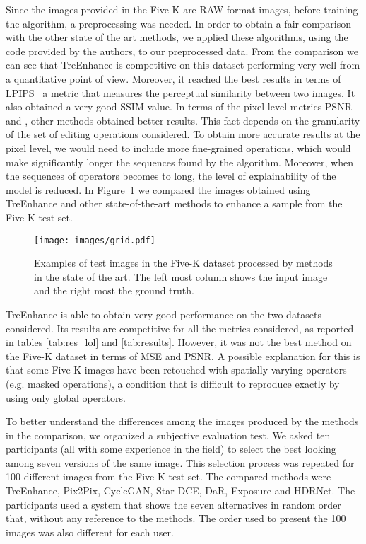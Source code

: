 \documentclass[3p,twocolumn]{elsarticle}
\newcommand{\method}[0]{TreEnhance}
\begin{document}
Since the images provided in the Five-K are RAW format images, before training the algorithm, a preprocessing was needed. In order to obtain a fair comparison with the other state of the art methods, we applied these algorithms, using the code provided by the authors, to our preprocessed data.
From the comparison we can see that \method{} is competitive on this dataset performing very well from a quantitative point of view. Moreover, it reached the best results in terms of LPIPS~\cite{zhang2018perceptual} a metric that measures the perceptual similarity between two images. It also obtained a very good SSIM value.  In terms of the pixel-level metrics PSNR and , other methods obtained better  results.  This fact depends on the granularity of the set of editing operations considered.  To obtain more accurate results at the pixel level, we would need to include more fine-grained operations, which would make significantly longer the sequences found by the algorithm. Moreover, when the sequences of operators becomes to long, the level of explainability of the model is reduced.
In Figure~\ref{fig:comparison} we compared the images obtained using \method{} and other state-of-the-art methods to enhance a sample from the Five-K test set.
\begin{figure}
    \centering
    \texttt{[image: images/grid.pdf]}
    \caption{Examples of test images in the Five-K dataset processed by methods in the state of the art. The left most column shows the input image and the right most the ground truth.}
    \label{fig:comparison}
\end{figure}

\method{} is able to obtain very good performance on the two datasets considered. Its results are competitive for all the metrics considered, as reported in tables \ref{tab:res_lol} and \ref{tab:results}. However, it was not the best method on the Five-K dataset in terms of MSE and PSNR. A possible explanation for this is that
some Five-K images have been retouched with spatially varying operators (e.g. masked operations), a condition that is difficult to reproduce exactly by using only global operators.


To better understand the differences among the images produced by the methods in the comparison, we organized a subjective evaluation test.
We asked ten participants (all with some experience in the field) to select the best looking among seven versions of the same image. This selection process was repeated for 100 different images from the Five-K test set. The compared methods were \method{}, Pix2Pix, CycleGAN, Star-DCE, DaR, Exposure and HDRNet.  The participants used a system that shows the seven alternatives in random order that, without any reference to the methods.  The order used to present the 100 images was also different for each user.
\end{document}
